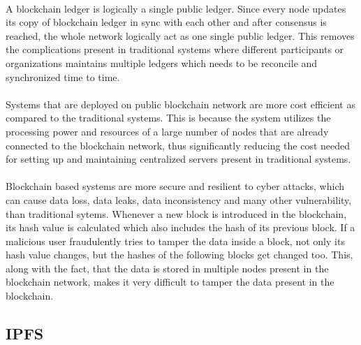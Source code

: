 \documentclass{article}
\begin{document}
        \paragraph{}
        A blockchain ledger is logically a single public ledger. Since every node updates its copy of blockchain ledger in sync with each other and after consensus is reached, the whole network logically act as one single public ledger. This removes the complications present in traditional systems where different participants or organizations maintains multiple ledgers which needs to be reconcile and synchronized time to time.

        \paragraph{}
        Systems that are deployed on public blockchain network are more cost efficient as compared to the traditional systems. This is because the system utilizes the processing power and resources of a large number of nodes that are already connected to the blockchain network, thus significantly reducing the cost needed for setting up and maintaining centralized servers present in traditional systems.

        \paragraph{}
        Blockchain based systems are more secure and resilient to cyber attacks, which can cause data loss, data leaks, data inconsistency and many other vulnerability, than traditional sytems. Whenever a new block is introduced in the blockchain, its hash value is calculated which also includes the hash of its previous block. If a malicious user fraudulently tries to tamper the data inside a block, not only its hash value changes, but the hashes of the following blocks get changed too. This, along with the fact, that the data is stored in multiple nodes present in the blockchain network, makes it very difficult to tamper the data present in the blockchain.
        
        \paragraph{}

    \subsection{IPFS}
\end{document}

